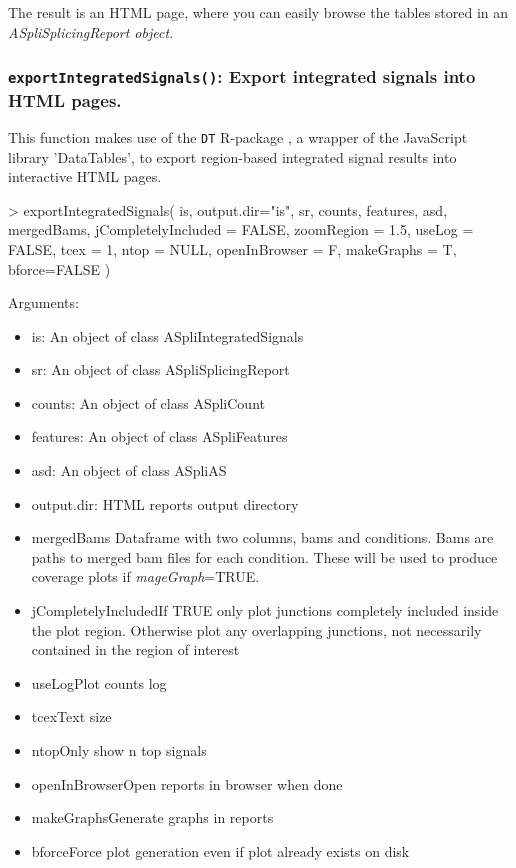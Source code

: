 \documentclass{article}
\begin{document}
The result is an HTML page, where you can easily browse the tables stored in an \em{ASpliSplicingReport}
object.


\subsubsection{\texttt{exportIntegratedSignals()}: Export integrated signals into HTML pages.} \label{sec:reports2}

This function makes use of the \texttt{DT} R-package \cite{DTpackage}, a wrapper of the JavaScript library 'DataTables', to export region-based integrated signal results into interactive HTML pages.

\begin{Schunk}
\begin{Sinput}
> exportIntegratedSignals( is, output.dir="is", 
                          sr, counts, features, asd,
                          mergedBams, 
                          jCompletelyIncluded = FALSE, zoomRegion = 1.5, 
                          useLog = FALSE, tcex = 1, ntop = NULL, openInBrowser = F, 
                          makeGraphs = T, bforce=FALSE
                         )
\end{Sinput}
\end{Schunk}

Arguments:
\begin{itemize}
\item is:	An object of class ASpliIntegratedSignals
\item sr:	An object of class ASpliSplicingReport
\item counts: An object of class ASpliCount
\item features: An object of class ASpliFeatures
\item asd: An object of class ASpliAS
\item output.dir: HTML reports output directory 
\item{mergedBams}{
    Dataframe with two columns, bams and conditions. Bams are paths to merged bam files for each condition. These will be used to produce coverage plots if {\em mageGraph}=TRUE. 
  }
  \item{jCompletelyIncluded}{If TRUE only plot junctions completely included inside the plot region. Otherwise plot any overlapping junctions, not necessarily contained in the region of interest}
  \item{useLog}{Plot counts log}
  \item{tcex}{Text size}
  \item{ntop}{Only show n top signals}
  \item{openInBrowser}{Open reports in browser when done}
  \item{makeGraphs}{Generate graphs in reports}
  \item{bforce}{Force plot generation even if plot already exists on disk}
\end{itemize}
\end{document}
